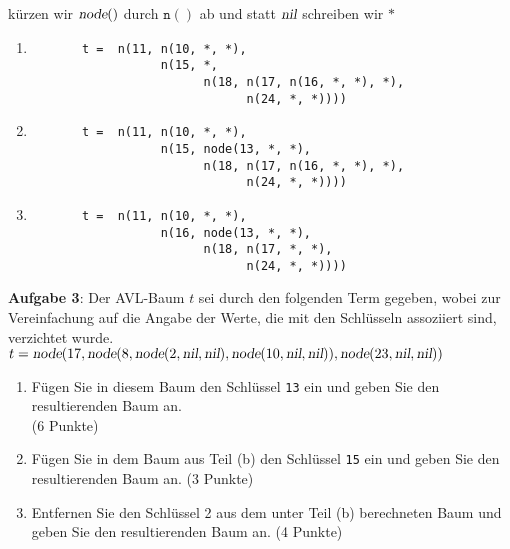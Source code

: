 \documentclass{article}
\begin{document}
k\"urzen wir $\textsl{node}()$ durch $\mathtt{n}()$ ab und statt $\textsl{nil}$ schreiben wir $\mathtt{*}$
\begin{enumerate}
\item \begin{verbatim}
       t =  n(11, n(10, *, *),
                  n(15, *, 
                        n(18, n(17, n(16, *, *), *), 
                              n(24, *, *))))
      \end{verbatim}
\item \begin{verbatim}
       t =  n(11, n(10, *, *),
                  n(15, node(13, *, *),
                        n(18, n(17, n(16, *, *), *), 
                              n(24, *, *))))
      \end{verbatim}
\item \begin{verbatim}
       t =  n(11, n(10, *, *),
                  n(16, node(13, *, *),
                        n(18, n(17, *, *), 
                              n(24, *, *))))
      \end{verbatim}
\end{enumerate}
\vspace{0.3cm}

\noindent
\textbf{Aufgabe 3}: Der AVL-Baum $t$ sei durch den folgenden Term gegeben,
wobei zur Vereinfachung auf die Angabe der Werte, die mit den Schl\"usseln
assoziiert sind, verzichtet wurde.
\\[0.2cm]
\hspace*{1.3cm}
$t = \textsl{node}(17, 
           \textsl{node}(8, 
               \textsl{node}(2, \textsl{nil}, \textsl{nil}),
               \textsl{node}(10, \textsl{nil}, \textsl{nil})), 
           \textsl{node}(23,\textsl{nil},\textsl{nil}))$
\begin{enumerate}
\item F\"ugen Sie  in diesem Baum den Schl\"ussel \texttt{13} ein und geben Sie den
      resultierenden Baum an.   \\[0.2cm]
      \hspace*{\fill} (6 Punkte)
\item F\"ugen Sie in dem Baum aus Teil (b) den Schl\"ussel \texttt{15} ein und geben Sie den
      resultierenden Baum an.
      \hspace*{\fill} (3 Punkte)
\item Entfernen Sie den Schl\"ussel 2 aus dem unter Teil (b) berechneten Baum und geben Sie
      den resultierenden Baum an.
      \hspace*{\fill} (4 Punkte)
\end{enumerate}
\pagebreak
\end{document}
